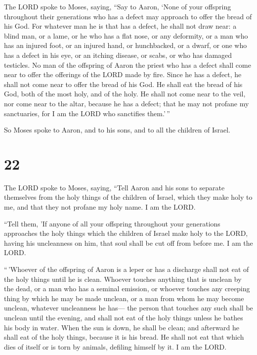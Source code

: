  The LORD spoke to Moses, saying,  ``Say to
Aaron, `None of your offspring throughout their generations who has a
defect may approach to offer the bread of his God.  For
whatever man he is that has a defect, he shall not draw near: a blind
man, or a lame, or he who has a flat nose, or any deformity,
 or a man who has an injured foot, or an injured hand,
 or hunchbacked, or a dwarf, or one who has a defect in his
eye, or an itching disease, or scabs, or who has damaged testicles.
 No man of the offspring of Aaron the priest who has a
defect shall come near to offer the offerings of the LORD made by fire.
Since he has a defect, he shall not come near to offer the bread of his
God.  He shall eat the bread of his God, both of the most
holy, and of the holy.  He shall not come near to the veil,
nor come near to the altar, because he has a defect; that he may not
profane my sanctuaries, for I am the LORD who sanctifies them.'\,''

 So Moses spoke to Aaron, and to his sons, and to all the
children of Israel.

\hypertarget{section-21}{%
\section{22}\label{section-21}}

 The LORD spoke to Moses, saying,  ``Tell Aaron
and his sons to separate themselves from the holy things of the children
of Israel, which they make holy to me, and that they not profane my holy
name. I am the LORD.

 ``Tell them, 'If anyone of all your offspring throughout
your generations approaches the holy things which the children of Israel
make holy to the LORD, having his uncleanness on him, that soul shall be
cut off from before me. I am the LORD.

 ``\,'Whoever of the offspring of Aaron is a leper or has a
discharge shall not eat of the holy things until he is clean. Whoever
touches anything that is unclean by the dead, or a man who has a seminal
emission,  or whoever touches any creeping thing by which he
may be made unclean, or a man from whom he may become unclean, whatever
uncleanness he has---  the person that touches any such
shall be unclean until the evening, and shall not eat of the holy things
unless he bathes his body in water.  When the sun is down,
he shall be clean; and afterward he shall eat of the holy things,
because it is his bread.  He shall not eat that which dies
of itself or is torn by animals, defiling himself by it. I am the LORD.

